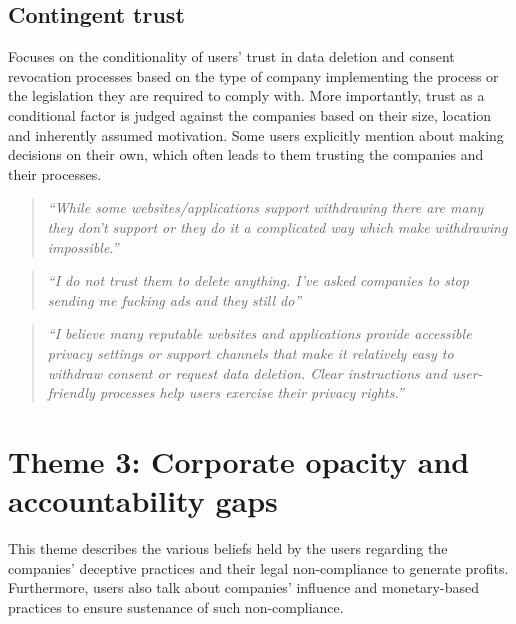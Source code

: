 \subsection{Contingent trust} \label{T2.4:Mixed trust}
Focuses on the conditionality of users' trust in data deletion and consent revocation processes based on the type of company implementing the process or the legislation they are required to comply with. More importantly, trust as a conditional factor is judged against the companies based on their size, location and inherently assumed motivation. Some users explicitly mention about making decisions on their own, which often leads to them trusting the companies and their processes.
        \begin{quote}
            \textit{``While some websites/applications support withdrawing there are many they don’t support or they do it a complicated way which make withdrawing impossible.''}
        \end{quote}
        \begin{quote}
            \textit{``I do not trust them to delete anything. I've asked companies to stop sending me fucking ads and they still do''}
        \end{quote}
        \begin{quote}
            \textit{``I believe many reputable websites and applications provide accessible privacy settings or support channels that make it relatively easy to withdraw consent or request data deletion. Clear instructions and user-friendly processes help users exercise their privacy rights.''}
        \end{quote}

    
\section{Theme 3: Corporate opacity and accountability gaps} \label{T3:Corporate scam}
This theme describes the various beliefs held by the users regarding the companies' deceptive practices and their legal non-compliance to generate profits. Furthermore, users also talk about companies' influence and monetary-based practices to ensure sustenance of such non-compliance.


